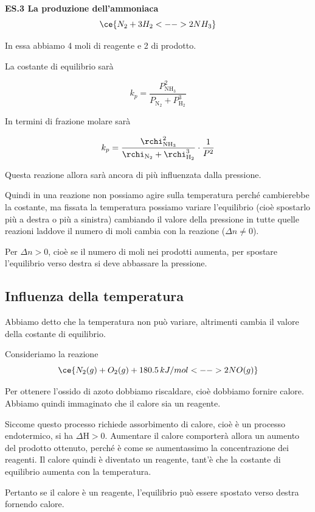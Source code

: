 \vspace{0.2cm}\textbf{ES.3 La produzione dell'ammoniaca}
$$\ce{N_2 + 3H_2 <--> 2NH_3}$$

In essa abbiamo 4 moli di reagente e 2 di prodotto.

La costante di equilibrio sarà

$$k_p = \frac{P_{\text{NH}_3}^2}{P_{\text{N}_2} + P_{\text{H}_2}^3}$$

In termini di frazione molare sarà

$$k_p = \frac{\rchi_{\text{NH}_3}^2}{\rchi_{\text{N}_2} + \rchi_{\text{H}_2}^3} \cdot \frac{1}{P^2}$$

Questa reazione allora sarà ancora di più influenzata dalla pressione.

\vspace{0.2cm}Quindi in una reazione non possiamo agire sulla temperatura perché cambierebbe la costante, ma fissata la temperatura possiamo variare l'equilibrio (cioè spostarlo più a destra o più a sinistra) cambiando il valore della pressione in tutte quelle reazioni laddove il numero di moli cambia con la reazione ($\Delta n \neq 0$).

\vspace{0.2cm}Per $\Delta n > 0$, cioè se il numero di moli nei prodotti aumenta, per spostare l'equilibrio verso destra si deve abbassare la pressione.

\subsection{Influenza della temperatura}
Abbiamo detto che la temperatura non può variare, altrimenti cambia il valore della costante di equilibrio.

Consideriamo la reazione
$$\ce{N_2(g) + O_2(g) + 180.5 \, kJ/mol <--> 2NO(g)}$$

Per ottenere l'ossido di azoto dobbiamo riscaldare, cioè dobbiamo fornire calore. Abbiamo quindi immaginato che il calore sia un reagente.

Siccome questo processo richiede assorbimento di calore, cioè è un processo endotermico, si ha $\Delta$H$>0$. Aumentare il calore comporterà allora un aumento del prodotto ottenuto, perché è come se aumentassimo la concentrazione dei reagenti. Il calore quindi è diventato un reagente, tant'è che la costante di equilibrio aumenta con la temperatura.

Pertanto se il calore è un reagente, l'equilibrio può essere spostato verso destra fornendo calore.

